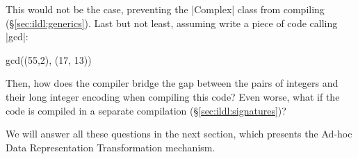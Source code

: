 This would not be the case, preventing the |Complex| class from compiling (\S\ref{sec:ildl:generics}). Last but not least, assuming write a piece of code calling |gcd|:

\begin{lstlisting-nobreak}
gcd((55,2), (17, 13))
\end{lstlisting-nobreak}

Then, how does the compiler bridge the gap between the pairs of integers and their long integer encoding when compiling this code? Even worse, what if the code is compiled in a separate compilation (\S\ref{sec:ildl:signatures})?

We will answer all these questions in the next section, which presents the Ad-hoc Data Representation Transformation mechanism.